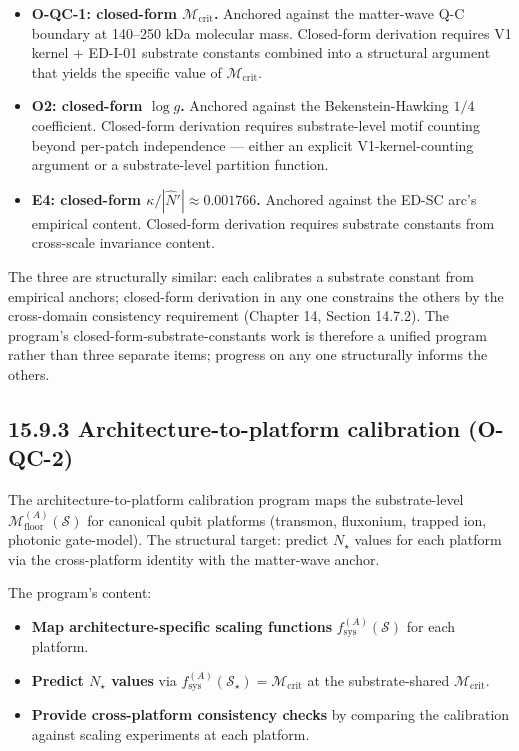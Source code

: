 \documentclass[11pt]{book}
\begin{document}
\begin{itemize}
\item \textbf{O-QC-1: closed-form $\mathcal{M}_\mathrm{crit}$.} Anchored against the matter-wave Q-C boundary at 140–250 kDa molecular mass. Closed-form derivation requires V1 kernel + ED-I-01 substrate constants combined into a structural argument that yields the specific value of $\mathcal{M}_\mathrm{crit}$.
\item \textbf{O2: closed-form $\log g$.} Anchored against the Bekenstein-Hawking $1/4$ coefficient. Closed-form derivation requires substrate-level motif counting beyond per-patch independence — either an explicit V1-kernel-counting argument or a substrate-level partition function.
\item \textbf{E4: closed-form $\kappa/|\hat{N}'| \approx 0.001766$.} Anchored against the ED-SC arc's empirical content. Closed-form derivation requires substrate constants from cross-scale invariance content.
\end{itemize}

The three are structurally similar: each calibrates a substrate constant from empirical anchors; closed-form derivation in any one constrains the others by the cross-domain consistency requirement (Chapter 14, Section 14.7.2). The program's closed-form-substrate-constants work is therefore a unified program rather than three separate items; progress on any one structurally informs the others.

\subsection{15.9.3 Architecture-to-platform calibration (O-QC-2)}

The architecture-to-platform calibration program maps the substrate-level $\mathcal{M}_\mathrm{floor}^{(A)}(\mathcal{S})$ for canonical qubit platforms (transmon, fluxonium, trapped ion, photonic gate-model). The structural target: predict $N_\star$ values for each platform via the cross-platform identity with the matter-wave anchor.

The program's content:
\begin{itemize}
\item \textbf{Map architecture-specific scaling functions} $f_\mathrm{sys}^{(A)}(\mathcal{S})$ for each platform.
\item \textbf{Predict $N_\star$ values} via $f_\mathrm{sys}^{(A)}(\mathcal{S}_\star) = \mathcal{M}_\mathrm{crit}$ at the substrate-shared $\mathcal{M}_\mathrm{crit}$.
\item \textbf{Provide cross-platform consistency checks} by comparing the calibration against scaling experiments at each platform.
\end{itemize}
\end{document}
